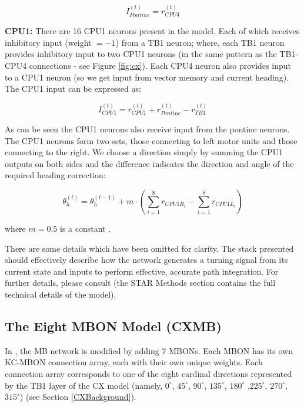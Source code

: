 \documentclass[a4paper,11pt,twoside,openright]{article}
\begin{document}
\begin{equation}
  I_{Pontine}^{(t)} = r_{CPU4}^{(t)}
\end{equation}

\textbf{CPU1:}
There are 16 CPU1 neurons present in the model. Each of which
receives inhibitory input (weight $= -1$) from a TB1 neuron; where, each
TB1 neuron provides inhibitory input to two CPU1 neurons (in the same pattern
as the TB1-CPU4 connections - see Figure \ref{fig:cx}). Each CPU4 neuron also
provides input to a CPU1 neuron (so we get input from vector memory and current
heading). The CPU1 input can be expressed as:

\begin{equation}
  I_{CPU1}^{(t)} = r_{CPU1}^{(t)} + r_{Pontine}^{(t)} - r_{TB1}^{(t)}
\end{equation}

As can be seen the CPU1 neurons also receive input from the pontine neurons.
The CPU1 neurons form two sets, those connecting to left motor units and those
connecting to the right. We choose a direction simply by summing the CPU1 outputs
on both sides and the difference indicates the direction and angle of the
required heading correction:

\begin{equation}
  \theta_h^{(t)} = \theta_h^{(t - 1)} +
  m \cdot (\sum_{i = 1}^{8} r_{CPU1R_{i}} - \sum_{i = 1}^{8} r_{CPU1L_{i}})
\end{equation}

where $m = 0.5$ is a constant \cite{Stone2017}.
\newline
\par

There are some details which have been omitted for clarity. The stack presented
should effectively describe how the network generates a turning signal from its
current state and inputs to perform effective, accurate path integration. For
further details, please consult \cite{Stone2017} (the STAR Methods section
contains the full technical details of the model).

\subsection{ The Eight MBON Model (CXMB) } \label{CXMBBackground}
In \cite{Zhang2017}, the MB network is modified by adding 7 MBONs. Each MBON has
its own KC-MBON connection array, each with their own unique weights. Each
connection array corresponds to one of the eight cardinal directions represented
by the TB1 layer of the CX model (namely, $0^{\circ}$, $45^{\circ}$, $90^{\circ}$,
$135^{\circ}$, $180^{\circ}$ ,$225^{\circ}$, $270^{\circ}$, $315^{\circ}$) (see
Section \ref{CXBackground}).
\newline
\par
\end{document}
